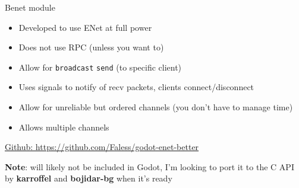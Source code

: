 \begin{frame}{Benet module}

\begin{itemize}
    \item Developed to use ENet at full power
    \item Does not use RPC (unless you want to)
    \item Allow for \texttt{broadcast} \texttt{send} (to specific client)
    \item Uses signals to notify of recv packets, clients connect/disconnect
    \item Allow for unreliable but ordered channels (you don't have to manage time)
    \item Allows multiple channels
\end{itemize}

\vspace{.2cm}

\href{https://github.com/Faless/godot-enet-better}{\footnotesize{Github: https://github.com/Faless/godot-enet-better}}

\vspace{.2cm}

\footnotesize{\textbf{Note}: will likely not be included in Godot, I'm looking to port it to the C API by \textbf{karroffel} and \textbf{bojidar-bg} when it's ready}

\end{frame}

